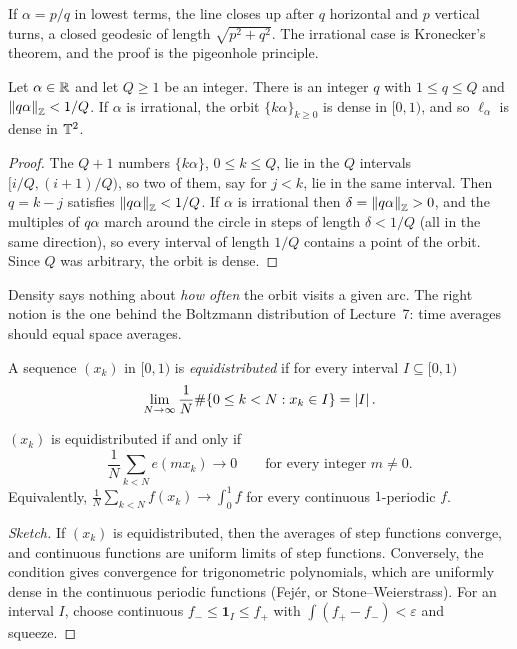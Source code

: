 If $\alpha=p/q$ in lowest terms, the line closes up after $q$ horizontal and $p$ vertical turns, a
closed geodesic of length $\sqrt{p^2+q^2}$. The irrational case is Kronecker's theorem, and the proof
is the pigeonhole principle.

\begin{proposition}\label{ERG:prop:dirichlet}
Let $\alpha\in\mathbb{R}$ and let $Q\ge1$ be an integer. There is an integer $q$ with $1\le q\le Q$ and
$\left\lVert q\alpha \right\rVert_{\mathbb{Z}}<1/Q$. If $\alpha$ is irrational, the orbit $\{k\alpha\}_{k\ge0}$ is dense in
$[0,1)$, and so $\ell_\alpha$ is dense in $\mathbb{T}^2$.
\end{proposition}

\begin{proof}
The $Q+1$ numbers $\{k\alpha\}$, $0\le k\le Q$, lie in the $Q$ intervals $[i/Q,(i+1)/Q)$, so two of
them, say for $j<k$, lie in the same interval. Then $q=k-j$ satisfies $\left\lVert q\alpha \right\rVert_{\mathbb{Z}}<1/Q$. If
$\alpha$ is irrational then $\delta=\left\lVert q\alpha \right\rVert_{\mathbb{Z}}>0$, and the multiples of $q\alpha$ march around
the circle in steps of length $\delta<1/Q$ (all in the same direction), so every interval of length
$1/Q$ contains a point of the orbit. Since $Q$ was arbitrary, the orbit is dense.
\end{proof}

Density says nothing about \emph{how often} the orbit visits a given arc. The right notion is the one
behind the Boltzmann distribution of Lecture~7: time averages should equal space averages.

\begin{definition}
A sequence $(x_k)$ in $[0,1)$ is \emph{equidistributed} if for every interval $I\subseteq[0,1)$
\[
  \lim_{N\to\infty}\frac1N\#\{0\le k<N: x_k\in I\}=\left\lvert I \right\rvert.
\]
\end{definition}

\begin{theorem}\label{ERG:thm:weylcrit}
$(x_k)$ is equidistributed if and only if
\[
  \frac1N\sum_{k<N}e(mx_k)\to0\qquad\text{for every integer } m\neq0.
\]
Equivalently, $\frac1N\sum_{k<N}f(x_k)\to\int_0^1f$ for every continuous $1$-periodic $f$.
\end{theorem}

\begin{proof}[Sketch]
If $(x_k)$ is equidistributed, then the averages of step functions converge, and continuous functions are
uniform limits of step functions. Conversely, the condition gives convergence for trigonometric
polynomials, which are uniformly dense in the continuous periodic functions (Fej\'er, or
Stone--Weierstrass). For an interval $I$, choose continuous $f_-\le\mathbf 1_I\le f_+$ with
$\int(f_+-f_-)<\varepsilon$ and squeeze.
\end{proof}

